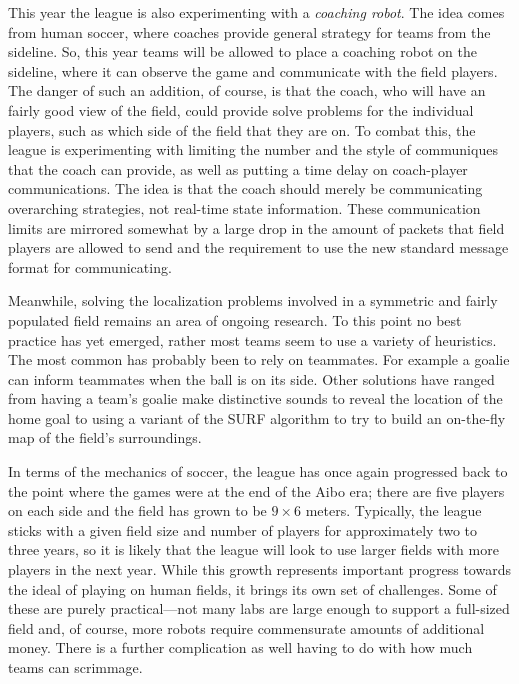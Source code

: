\documentclass{llncs}
\begin{document}
This year the league is also experimenting with a \textit{coaching robot}. The
idea comes from human soccer, where coaches provide general strategy
for teams from the sideline. So, this year teams will be allowed to place
a coaching robot on the sideline, where it can observe the game and communicate with the field players. The
danger of such an addition, of course, is that the coach, who will have an
fairly good view of the field, could provide solve
problems for the individual players, such as which side of the field
that they are on. To combat this, the league is experimenting with limiting
the number and the style of communiques that the coach can provide, 
as well as putting a time delay on coach-player communications.
The idea is that the coach should merely be communicating overarching
strategies, not real-time state information. 
These communication limits are mirrored somewhat by a large drop in
the amount of packets that field players are allowed to send
and the requirement to use the new standard message format for communicating.

Meanwhile, solving the localization problems involved in a symmetric 
and fairly populated 
field remains an area of ongoing research. To this point no best
practice has yet emerged, rather most teams seem to use a variety of
heuristics. The most common has probably been to rely on teammates. For
example a goalie can inform teammates when the ball is on its side.
Other solutions have ranged from having a team's goalie make
distinctive sounds to reveal the location of the home goal to using a variant of the SURF algorithm to try
to build an on-the-fly map of the field's surroundings.

In terms of the mechanics of soccer, the league has once again progressed
back to the point where the games were at
the end of the Aibo era; there are five players on each side and the field has grown to be $9\times 6$ meters. Typically,
the league sticks with a given field size and number of
players for approximately two to three years, so it is likely that the league
will look to use larger fields with more players in the next year. While this
growth represents important progress towards the ideal of playing
on human fields, it brings its own set of challenges. Some of these are
purely practical---not many labs are large enough to support a full-sized
field and, of course, more robots require commensurate amounts of additional
money. There is a further complication as well having to do with how
much teams can scrimmage. 
\end{document}
